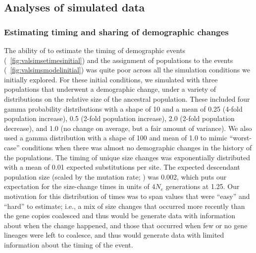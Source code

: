 \subsection{Analyses of simulated data}

\subsubsection{Estimating timing and sharing of demographic changes}

The ability of \ecoevolity to estimate the timing of
demographic events
(\fig{}~\ref{fig:valsimsetimesinitial})
and the assignment of populations to the
events
(\fig{}~\ref{fig:valsimsmodelinitial})
was quite poor across all the simulation conditions we initially explored.
For these initial conditions, we simulated \datasets with three populations
that underwent a demographic change, under a variety of distributions on the
relative size of the ancestral population.
These included four gamma probability distributions with a shape of 10 and a
mean of
0.25 (4-fold population increase),
0.5 (2-fold population increase),
2.0 (2-fold population decrease), and
1.0 (no change on average, but a fair amount of variance).
We also used a gamma distribution with a shape of 100 and mean of 1.0
to mimic ``worst-case'' conditions when there was almost no demographic
changes in the history of the populations.
The timing of unique size changes was exponentially distributed with a mean of
0.01 expected substitutions per site.
The expected descendant population size
(scaled by the mutation rate; \epopsize\murate)
was 0.002,
which puts our expectation for the size-change times in units of $4N_e$
generations at 1.25.
Our motivation for this distribution of times was to span values
that were ``easy'' and ``hard'' to estimate;
i.e., a mix of size changes that occurred more recently
than the gene copies coalesced and thus would be generate data with information
about when the change happened,
and those that occurred when few or no gene lineages were left to coalesce, and
thus would generate data with limited information about the timing of the
event.

\ifembed{

}{}

\ifembed{

}{}

